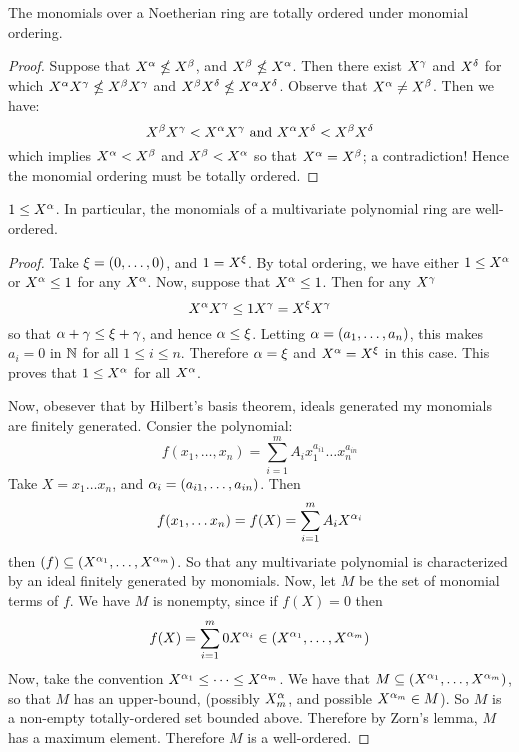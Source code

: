 \begin{lemma}\label{lemma_7.5.2}
  The monomials over a Noetherian ring are totally ordered under
  monomial ordering.
\end{lemma}
\begin{proof}
  Suppose that $X^\alpha \nleq X^\beta$, and $X^\beta \nleq X^\alpha$. Then there
  exist $X^\gamma$ and  $X^\delta$ for which  $X^\alpha X^\gamma \nleq X^\beta X^\gamma$ and
   $X^\beta X^\delta \nleq X^\alpha X^\delta$. Observe that $X^\alpha \neq X^\beta$.
   Then we have:
   \begin{equation*}
     X^\beta X^\gamma < X^\alpha X^\gamma \text{ and } X^\alpha X^\delta < X^\beta X^\delta
   \end{equation*}
   which implies $X^\alpha<X^\beta$ and $X^\beta < X^\alpha$ so that $X^\alpha=X^\beta$; a
   contradiction! Hence the monomial ordering must be totally ordered.
\end{proof}
\begin{corollary}
  $1 \leq X^\alpha$. In particular, the monomials of a multivariate
  polynomial ring are well-ordered.
\end{corollary}
\begin{proof}
  Take $\xi=(0, \dots, 0)$, and $1=X^\xi$. By total ordering, we have
  either $1 \leq X^\alpha$ or $X^\alpha \leq 1$ for any $X^\alpha$. Now, suppose
  that  $X^\alpha \leq 1$. Then for any $X^\gamma$
  \begin{equation*}
    X^\alpha X^\gamma \leq 1X^\gamma=X^\xi X^\gamma
  \end{equation*}
  so that $\alpha+\gamma \leq \xi+\gamma$, and hence $\alpha \leq \xi$. Letting
  $\alpha=(a_1, \dots, a_n)$, this makes $a_i=0$ in $\mathbb{N}$ for all
  $1 \leq i \leq n$. Therefore $\alpha=\xi$ and  $X^\alpha=X^\xi$ in this case.
  This proves that $1 \leq X^\alpha$ for all $X^\alpha$.

  Now, obesever that by Hilbert's basis theorem, ideals generated my
  monomials are finitely generated. Consier the polynomial:
  \begin{equation*}
    f(x_1, \dots, x_n)=\sum_{i=1}^m{A_ix_1^{a_{i1}} \dots x_n^{a_{in}}}
  \end{equation*}
  Take $X=x_1 \dots x_n$, and $\alpha_i=(a_{i1}, \dots, a_{in})$. Then
  \begin{equation*}
    f(x_1, \dots x_n)=f(X)=\sum_{i=1}^m{A_iX^{\alpha_i}}
  \end{equation*}
  then $(f) \subseteq (X^{\alpha_1}, \dots, X^{\alpha_m})$. So that any
  multivariate polynomial is characterized by an ideal finitely
  generated by monomials. Now, let $M$ be the set of monomial terms of
  $f$. We have $M$ is nonempty, since if $f(X)=0$ then
  \begin{equation*}
    f(X)=\sum_{i=1}^m{0X^{\alpha_i}} \in (X^{\alpha_1}, \dots, X^{\alpha_m})
  \end{equation*}
  Now, take the convention $X^{\alpha_1} \leq \dots \leq X^{\alpha_m}$. We
  have that $M \subseteq (X^{\alpha_1}, \dots, X^{\alpha_m})$, so that $M$ has
  an upper-bound, (possibly $X^\alpha_m$, and possible $X^{\alpha_m} \in M$).
  So $M$ is a non-empty totally-ordered set bounded above. Therefore
  by Zorn's lemma, $M$ has a maximum element. Therefore $M$ is a
  well-ordered.
\end{proof}

